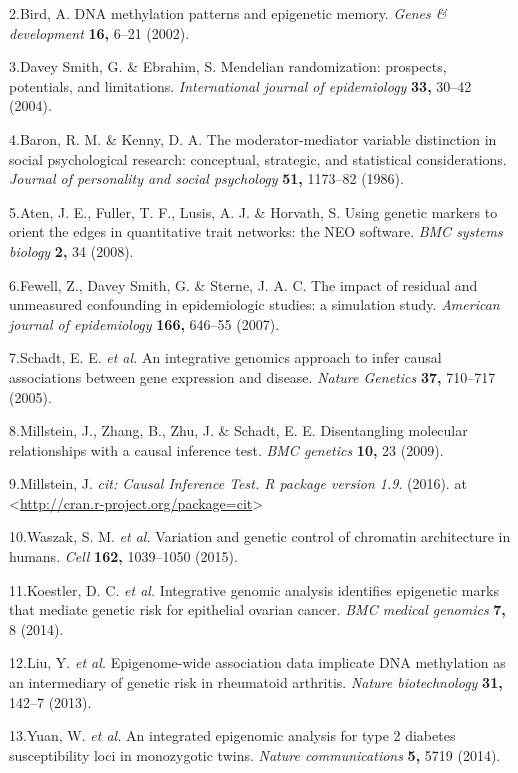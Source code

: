\documentclass[]{article}
\begin{document}
2.Bird, A. DNA methylation patterns and epigenetic memory. \emph{Genes
\& development} \textbf{16,} 6--21 (2002).

3.{Davey Smith}, G. \& Ebrahim, S. Mendelian randomization: prospects,
potentials, and limitations. \emph{International journal of
epidemiology} \textbf{33,} 30--42 (2004).

4.Baron, R. M. \& Kenny, D. A. The moderator-mediator variable
distinction in social psychological research: conceptual, strategic, and
statistical considerations. \emph{Journal of personality and social
psychology} \textbf{51,} 1173--82 (1986).

5.Aten, J. E., Fuller, T. F., Lusis, A. J. \& Horvath, S. Using genetic
markers to orient the edges in quantitative trait networks: the NEO
software. \emph{BMC systems biology} \textbf{2,} 34 (2008).

6.Fewell, Z., {Davey Smith}, G. \& Sterne, J. A. C. The impact of
residual and unmeasured confounding in epidemiologic studies: a
simulation study. \emph{American journal of epidemiology} \textbf{166,}
646--55 (2007).

7.Schadt, E. E. \emph{et al.} An integrative genomics approach to infer
causal associations between gene expression and disease. \emph{Nature
Genetics} \textbf{37,} 710--717 (2005).

8.Millstein, J., Zhang, B., Zhu, J. \& Schadt, E. E. Disentangling
molecular relationships with a causal inference test. \emph{BMC
genetics} \textbf{10,} 23 (2009).

9.Millstein, J. \emph{cit: Causal Inference Test. R package version
1.9}. (2016). at
\textless{}\url{http://cran.r-project.org/package=cit}\textgreater{}

10.Waszak, S. M. \emph{et al.} Variation and genetic control of
chromatin architecture in humans. \emph{Cell} \textbf{162,} 1039--1050
(2015).

11.Koestler, D. C. \emph{et al.} Integrative genomic analysis identifies
epigenetic marks that mediate genetic risk for epithelial ovarian
cancer. \emph{BMC medical genomics} \textbf{7,} 8 (2014).

12.Liu, Y. \emph{et al.} Epigenome-wide association data implicate DNA
methylation as an intermediary of genetic risk in rheumatoid arthritis.
\emph{Nature biotechnology} \textbf{31,} 142--7 (2013).

13.Yuan, W. \emph{et al.} An integrated epigenomic analysis for type 2
diabetes susceptibility loci in monozygotic twins. \emph{Nature
communications} \textbf{5,} 5719 (2014).
\end{document}
